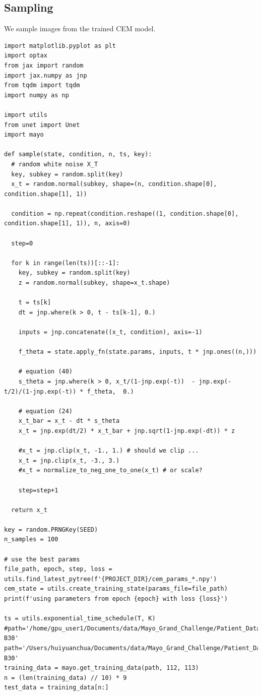 \documentclass[a4paper, 11pt]{article}
\begin{document}
\subsection{Sampling}
\label{sec:org10bb790}
We sample images from the trained CEM model.
\begin{verbatim}
import matplotlib.pyplot as plt
import optax
from jax import random
import jax.numpy as jnp
from tqdm import tqdm
import numpy as np

import utils
from unet import Unet
import mayo

def sample(state, condition, n, ts, key):
  # random white noise X_T
  key, subkey = random.split(key)
  x_t = random.normal(subkey, shape=(n, condition.shape[0], condition.shape[1], 1))

  condition = np.repeat(condition.reshape((1, condition.shape[0], condition.shape[1], 1)), n, axis=0)

  step=0

  for k in range(len(ts))[::-1]:
    key, subkey = random.split(key)
    z = random.normal(subkey, shape=x_t.shape)

    t = ts[k]
    dt = jnp.where(k > 0, t - ts[k-1], 0.)

    inputs = jnp.concatenate((x_t, condition), axis=-1)

    f_theta = state.apply_fn(state.params, inputs, t * jnp.ones((n,)))

    # equation (40)
    s_theta = jnp.where(k > 0, x_t/(1-jnp.exp(-t))  - jnp.exp(-t/2)/(1-jnp.exp(-t)) * f_theta,  0.)

    # equation (24)
    x_t_bar = x_t - dt * s_theta
    x_t = jnp.exp(dt/2) * x_t_bar + jnp.sqrt(1-jnp.exp(-dt)) * z

    #x_t = jnp.clip(x_t, -1., 1.) # should we clip ...
    x_t = jnp.clip(x_t, -3., 3.)
    #x_t = normalize_to_neg_one_to_one(x_t) # or scale?

    step=step+1

  return x_t

key = random.PRNGKey(SEED)
n_samples = 100

# use the best params
file_path, epoch, step, loss = utils.find_latest_pytree(f'{PROJECT_DIR}/cem_params_*.npy')
cem_state = utils.create_training_state(params_file=file_path)
print(f'using parameters from epoch {epoch} with loss {loss}')

ts = utils.exponential_time_schedule(T, K)
#path='/home/gpu_user1/Documents/data/Mayo_Grand_Challenge/Patient_Data/Training_Image_Data/3mm B30'
path='/Users/huiyuanchua/Documents/data/Mayo_Grand_Challenge/Patient_Data/Training_Image_Data/3mm B30'
training_data = mayo.get_training_data(path, 112, 113)
n = (len(training_data) // 10) * 9
test_data = training_data[n:]


\end{verbatim}
\end{document}
